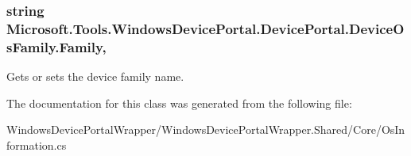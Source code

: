 \subsubsection[{\texorpdfstring{Family}{Family}}]{\setlength{\rightskip}{0pt plus 5cm}string Microsoft.\+Tools.\+Windows\+Device\+Portal.\+Device\+Portal.\+Device\+Os\+Family.\+Family\hspace{0.3cm}{\ttfamily [get]}, {\ttfamily [set]}}\hypertarget{class_microsoft_1_1_tools_1_1_windows_device_portal_1_1_device_portal_1_1_device_os_family_a4e7fd94ca487b03c57a4e97d41469d8f}{}\label{class_microsoft_1_1_tools_1_1_windows_device_portal_1_1_device_portal_1_1_device_os_family_a4e7fd94ca487b03c57a4e97d41469d8f}


Gets or sets the device family name. 



The documentation for this class was generated from the following file\+:\begin{DoxyCompactItemize}
\item 
Windows\+Device\+Portal\+Wrapper/\+Windows\+Device\+Portal\+Wrapper.\+Shared/\+Core/Os\+Information.\+cs\end{DoxyCompactItemize}
